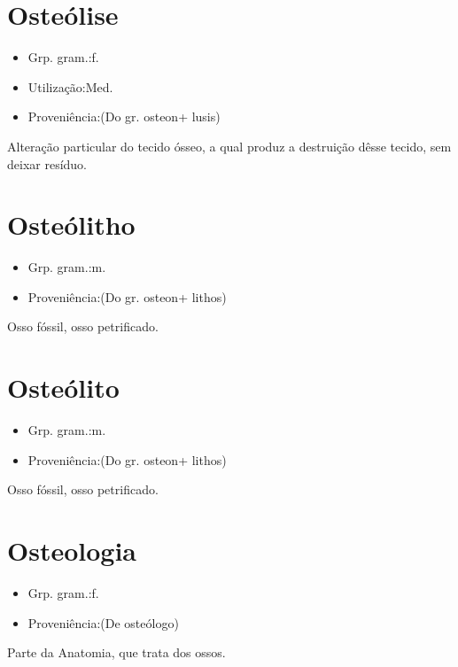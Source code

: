 \section{Osteólise}
\begin{itemize}
\item {Grp. gram.:f.}
\end{itemize}
\begin{itemize}
\item {Utilização:Med.}
\end{itemize}
\begin{itemize}
\item {Proveniência:(Do gr. \textunderscore osteon\textunderscore  + \textunderscore lusis\textunderscore )}
\end{itemize}
Alteração particular do tecido ósseo, a qual produz a destruição dêsse tecido, sem deixar resíduo.
\section{Osteólitho}
\begin{itemize}
\item {Grp. gram.:m.}
\end{itemize}
\begin{itemize}
\item {Proveniência:(Do gr. \textunderscore osteon\textunderscore  + \textunderscore lithos\textunderscore )}
\end{itemize}
Osso fóssil, osso petrificado.
\section{Osteólito}
\begin{itemize}
\item {Grp. gram.:m.}
\end{itemize}
\begin{itemize}
\item {Proveniência:(Do gr. \textunderscore osteon\textunderscore  + \textunderscore lithos\textunderscore )}
\end{itemize}
Osso fóssil, osso petrificado.
\section{Osteologia}
\begin{itemize}
\item {Grp. gram.:f.}
\end{itemize}
\begin{itemize}
\item {Proveniência:(De \textunderscore osteólogo\textunderscore )}
\end{itemize}
Parte da Anatomia, que trata dos ossos.
